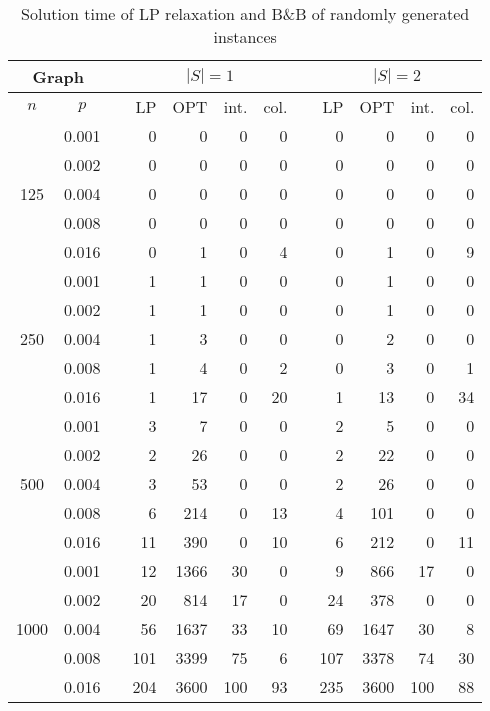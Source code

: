\begin{table}[]
\begin{tabular}{ccrrrrrrrrrr}
\multicolumn{2}{c}{Graph} & & \multicolumn{4}{c}{$|S|=1$} & &\multicolumn{4}{c}{$|S|=2$} \\
\hline
$n$ & $p$ & & LP  & OPT & int. & col.& & LP  & OPT & int. & col. \\
\hline                     
\multirow{5}{*}{125}       
 & 0.001 & &0   &  0 & 0 & 0 & & 0  &  0 &  0  &  0 \\ 
 & 0.002 & &0   &  0 & 0 & 0 & & 0  &  0 &  0  &  0 \\
 & 0.004 & &0   &  0 & 0 & 0 & & 0  &  0 &  0  &  0 \\
 & 0.008 & &0   &  0 & 0 & 0 & & 0  &  0 &  0  &  0 \\
 & 0.016 & &0   &  1 & 0 & 4 & & 0  &  1 &  0  &  9 \\
\hline                         
\multirow{5}{*}{250}                               
 & 0.001 & & 1  &  1 & 0 & 0 & & 0  &  1 & 0   & 0  \\
 & 0.002 & & 1  &  1 & 0 & 0 & & 0  &  1 & 0   & 0  \\
 & 0.004 & & 1  &  3 & 0 & 0 & & 0  &  2 & 0   & 0  \\
 & 0.008 & & 1  &  4 & 0 & 2 & & 0  &  3 & 0   & 1  \\
 & 0.016 & & 1  & 17 & 0 &20 & & 1  & 13 & 0   &34  \\
\hline                         
\multirow{5}{*}{500}                               
 & 0.001 & & 3   &  7 & 0 & 0 & & 2  &  5 & 0   & 0  \\
 & 0.002 & & 2   & 26 & 0 & 0 & & 2  & 22 & 0   & 0  \\
 & 0.004 & & 3   & 53 & 0 & 0 & & 2  & 26 & 0   & 0  \\
 & 0.008 & & 6   &214 & 0 &13 & & 4  &101 & 0   & 0  \\
 & 0.016 & &11   &390 & 0 &10 & & 6  &212 & 0   &11  \\
\hline                         
\multirow{5}{*}{1000}                               
 & 0.001 & & 12  &1366& 30& 0 & & 9  &866   & 17 & 0 \\
 & 0.002 & & 20  & 814& 17& 0 & & 24 &378   & 0  & 0 \\
 & 0.004 & & 56  &1637& 33&10 & & 69 &1647  & 30 & 8 \\
 & 0.008 & &101  &3399& 75& 6 & & 107&3378  & 74 &30 \\
 & 0.016 & &204  &3600&100&93 & & 235&3600  &100 &88 
\end{tabular}
\caption{Solution time of LP relaxation and B\&B of randomly generated instances}
\label{tab:soltime}
\end{table}
			 

